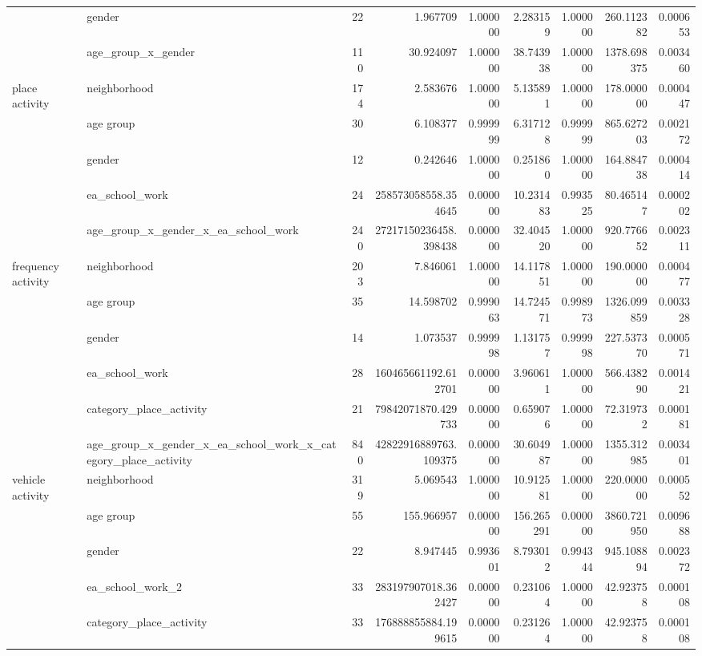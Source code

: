 \begin{tabular}{ll|r|rr|rr|rr}
 & gender & 22 & 1.967709 & 1.000000 & 2.283159 & 1.000000 & 260.112382 & 0.000653 \\
 & age_group_x_gender & 110 & 30.924097 & 1.000000 & 38.743938 & 1.000000 & 1378.698375 & 0.003460 \\
\cline{1-9}
\multirow[t]{5}{*}{place activity} & neighborhood & 174 & 2.583676 & 1.000000 & 5.135891 & 1.000000 & 178.000000 & 0.000447 \\
 & age group & 30 & 6.108377 & 0.999999 & 6.317128 & 0.999999 & 865.627203 & 0.002172 \\
 & gender & 12 & 0.242646 & 1.000000 & 0.251860 & 1.000000 & 164.884738 & 0.000414 \\
 & ea_school_work & 24 & 258573058558.354645 & 0.000000 & 10.231483 & 0.993525 & 80.465147 & 0.000202 \\
 & age_group_x_gender_x_ea_school_work & 240 & 27217150236458.398438 & 0.000000 & 32.404520 & 1.000000 & 920.776652 & 0.002311 \\
\cline{1-9}
\multirow[t]{6}{*}{frequency activity} & neighborhood & 203 & 7.846061 & 1.000000 & 14.117851 & 1.000000 & 190.000000 & 0.000477 \\
 & age group & 35 & 14.598702 & 0.999063 & 14.724571 & 0.998973 & 1326.099859 & 0.003328 \\
 & gender & 14 & 1.073537 & 0.999998 & 1.131757 & 0.999998 & 227.537370 & 0.000571 \\
 & ea_school_work & 28 & 160465661192.612701 & 0.000000 & 3.960611 & 1.000000 & 566.438290 & 0.001421 \\
 & category_place_activity & 21 & 79842071870.429733 & 0.000000 & 0.659076 & 1.000000 & 72.319732 & 0.000181 \\
 & age_group_x_gender_x_ea_school_work_x_category_place_activity & 840 & 42822916889763.109375 & 0.000000 & 30.604987 & 1.000000 & 1355.312985 & 0.003401 \\
\cline{1-9}
\multirow[t]{7}{*}{vehicle activity} & neighborhood & 319 & 5.069543 & 1.000000 & 10.912581 & 1.000000 & 220.000000 & 0.000552 \\
 & age group & 55 & 155.966957 & 0.000000 & 156.265291 & 0.000000 & 3860.721950 & 0.009688 \\
 & gender & 22 & 8.947445 & 0.993601 & 8.793012 & 0.994344 & 945.108894 & 0.002372 \\
 & ea_school_work_2 & 33 & 283197907018.362427 & 0.000000 & 0.231064 & 1.000000 & 42.923758 & 0.000108 \\
 & category_place_activity & 33 & 176888855884.199615 & 0.000000 & 0.231264 & 1.000000 & 42.923758 & 0.000108 \\

\end{tabular}
